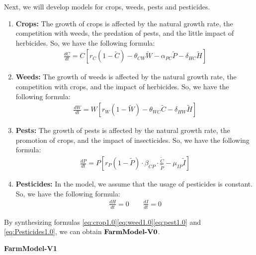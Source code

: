\documentclass[12pt]{article}  %
\begin{document}
Next, we will develop models for crops, weeds, pests and pesticides.
\begin{enumerate}
    \item \textbf{Crops:} The growth of crops is affected by the natural 
    growth rate, the competition with weeds, the predation of pests, and 
    the little impact of herbicides. So, we have the following formula:
        \begin{align}
            \frac{dC}{dt} = C \left[ r_C \left( 1 - \tilde{C} \right) - \theta_{CW} \tilde{W} - \alpha_{PC} \tilde{P} - \delta_{HC} \tilde{H} \right] \label{eq:crop1.0}
        \end{align}
    \item \textbf{Weeds:} The growth of weeds is affected by the natural
    growth rate, the competition with crops, and the impact of herbicides.
    So, we have the following formula:
        \begin{align}
            \frac{dW}{dt} = W \left[ r_W \left( 1 - \tilde{W} \right) - \theta_{WC} \tilde{C} - \delta_{HW} \tilde{H} \right]\label{eq:weed1.0}
        \end{align}
    \item \textbf{Pests:} The growth of pests is affected by the natural 
    growth rate, the promotion of crops, and the impact of insecticides.
    So, we have the following formula:
        \begin{align}
            \frac{dP}{dt} = P \left[ r_P \left( 1 - \tilde{P} \right)\cdot\beta_{CP}\cdot\frac{\tilde C}{\tilde P} - \mu_{IP} \tilde{I} \right]\label{eq:pest1.0}
        \end{align}
    \item \textbf{Pesticides:} In the model, we assume that the usage of
    pesticides is constant. So, we have the following formula:
            \begin{align}
            \frac{dH}{dt} = 0 \qquad \frac{dI}{dt} = 0 \label{eq:Pesticides1.0}
            \end{align}
\end{enumerate}
By synthesizing formulas \eqref{eq:crop1.0}\eqref{eq:weed1.0}\eqref{eq:pest1.0} and
\eqref{eq:Pesticides1.0}, we can obtain $\text{\textbf{FarmModel-V0}}\label{eq:FarmModel-V0}$.

\noindent\textbf{FarmModel-V1}
\end{document}
